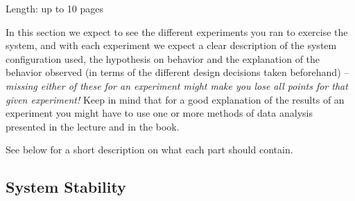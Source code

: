 \documentclass[11pt]{article}
\begin{document}
Length: up to 10 pages

In this section we expect to see the different experiments you ran to
exercise the system, and with each experiment we expect a clear
description of the system configuration used, the hypothesis on behavior
and the explanation of the behavior observed (in terms of the different
design decisions taken beforehand) -- \emph{missing either of these for
an experiment might make you lose all points for that given experiment!}
Keep in mind that for a good explanation of the results of an experiment
you might have to use one or more methods of data analysis presented in
the lecture and in the book.

See below for a short description on what each part should contain.

\subsection{System Stability}\label{sec:system-stability}
\end{document}

